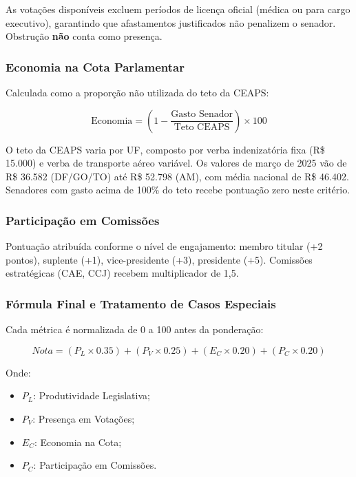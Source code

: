 As votações disponíveis excluem períodos de licença oficial (médica ou para cargo executivo), garantindo que afastamentos justificados não penalizem o senador. Obstrução \textbf{não} conta como presença.

\subsubsection{Economia na Cota Parlamentar}

Calculada como a proporção não utilizada do teto da CEAPS:

\begin{equation}
\text{Economia} = \left(1 - \frac{\text{Gasto Senador}}{\text{Teto CEAPS}}\right) \times 100
\end{equation}

O teto da CEAPS varia por UF, composto por verba indenizat\'{o}ria fixa (R\$ 15.000) e verba de transporte a\'{e}reo vari\'{a}vel. Os valores de mar\c{c}o de 2025 v\~{a}o de R\$ 36.582 (DF/GO/TO) at\'{e} R\$ 52.798 (AM), com m\'{e}dia nacional de R\$ 46.402. Senadores com gasto acima de 100\% do teto recebe pontua\c{c}\~{a}o zero neste crit\'{e}rio.

\subsubsection{Participação em Comissões}

Pontuação atribuída conforme o nível de engajamento: membro titular (+2 pontos), suplente (+1), vice-presidente (+3), presidente (+5). Comissões estratégicas (CAE, CCJ) recebem multiplicador de 1,5.

\subsubsection{Fórmula Final e Tratamento de Casos Especiais}

Cada métrica é normalizada de 0 a 100 antes da ponderação:

\begin{equation}
\textit{Nota} = (P_L \times 0.35) + (P_V \times 0.25) + (E_C \times 0.20) + (P_C \times 0.20)
\end{equation}

Onde:
\begin{itemize}
    \item $P_L$: Produtividade Legislativa;
    \item $P_V$: Presença em Votações;
    \item $E_C$: Economia na Cota;
    \item $P_C$: Participação em Comissões.
\end{itemize}

